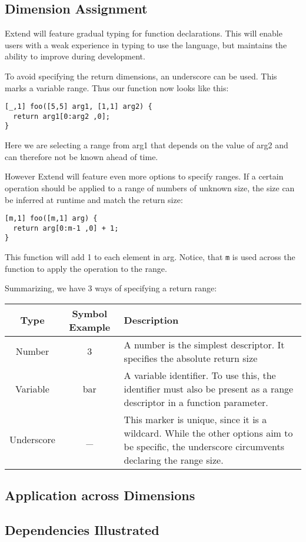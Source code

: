 \subsection{Dimension Assignment}
\par Extend will feature gradual typing for function declarations. This will enable users with a weak experience in typing to use the language, but maintains the ability to improve during development.
\par To avoid specifying the return dimensions, an underscore can be used. This marks a variable range. Thus our function now looks like this:
\begin{lstlisting}
[_,1] foo([5,5] arg1, [1,1] arg2) {
  return arg1[0:arg2 ,0];
}
\end{lstlisting}
Here we are selecting a range from arg1 that depends on the value of arg2 and can therefore not be known ahead of time.
\par However Extend will feature even more options to specify ranges. If a certain operation should be applied to a range of numbers of unknown size, the size can be inferred at runtime and match the return size:
\begin{lstlisting}
[m,1] foo([m,1] arg) {
  return arg[0:m-1 ,0] + 1;
}
\end{lstlisting}
This function will add 1 to each element in arg. Notice, that \texttt{m} is used across the function to apply the operation to the range.
\par Summarizing, we have 3 ways of specifying a return range:\newline
\begin{tabularx}{\columnwidth}{| c | c | X |} \hline
Type & Symbol Example & Description \\ \hline
Number & 3 & A number is the simplest descriptor. It specifies the absolute return size \\ \hline
Variable & bar & A variable identifier. To use this, the identifier must also be present as a range descriptor in a function parameter. \\ \hline
Underscore & \_ & This marker is unique, since it is a wildcard. While the other options aim to be specific, the underscore circumvents declaring the range size. \\ \hline
\end{tabularx}
\subsection{Application across Dimensions}
\subsection{Dependencies Illustrated}
